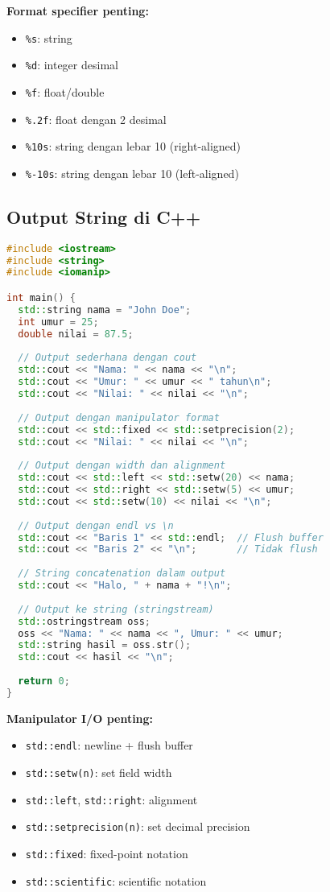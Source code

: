 \documentclass[../main.tex]{subfiles}
\begin{document}
\textbf{Format specifier penting:}
\begin{itemize}
  \item \texttt{\%s}: string
  \item \texttt{\%d}: integer desimal
  \item \texttt{\%f}: float/double
  \item \texttt{\%.2f}: float dengan 2 desimal
  \item \texttt{\%10s}: string dengan lebar 10 (right-aligned)
  \item \texttt{\%-10s}: string dengan lebar 10 (left-aligned)
\end{itemize}

\subsection{Output String di C++}

\begin{lstlisting}[language=C++, caption={Output string di C++}]
#include <iostream>
#include <string>
#include <iomanip>

int main() {
  std::string nama = "John Doe";
  int umur = 25;
  double nilai = 87.5;
  
  // Output sederhana dengan cout
  std::cout << "Nama: " << nama << "\n";
  std::cout << "Umur: " << umur << " tahun\n";
  std::cout << "Nilai: " << nilai << "\n";
  
  // Output dengan manipulator format
  std::cout << std::fixed << std::setprecision(2);
  std::cout << "Nilai: " << nilai << "\n";
  
  // Output dengan width dan alignment
  std::cout << std::left << std::setw(20) << nama;
  std::cout << std::right << std::setw(5) << umur;
  std::cout << std::setw(10) << nilai << "\n";
  
  // Output dengan endl vs \n
  std::cout << "Baris 1" << std::endl;  // Flush buffer
  std::cout << "Baris 2" << "\n";       // Tidak flush
  
  // String concatenation dalam output
  std::cout << "Halo, " + nama + "!\n";
  
  // Output ke string (stringstream)
  std::ostringstream oss;
  oss << "Nama: " << nama << ", Umur: " << umur;
  std::string hasil = oss.str();
  std::cout << hasil << "\n";
  
  return 0;
}
\end{lstlisting}

\textbf{Manipulator I/O penting:}
\begin{itemize}
  \item \texttt{std::endl}: newline + flush buffer
  \item \texttt{std::setw(n)}: set field width
  \item \texttt{std::left}, \texttt{std::right}: alignment
  \item \texttt{std::setprecision(n)}: set decimal precision
  \item \texttt{std::fixed}: fixed-point notation
  \item \texttt{std::scientific}: scientific notation
\end{itemize}
\end{document}
